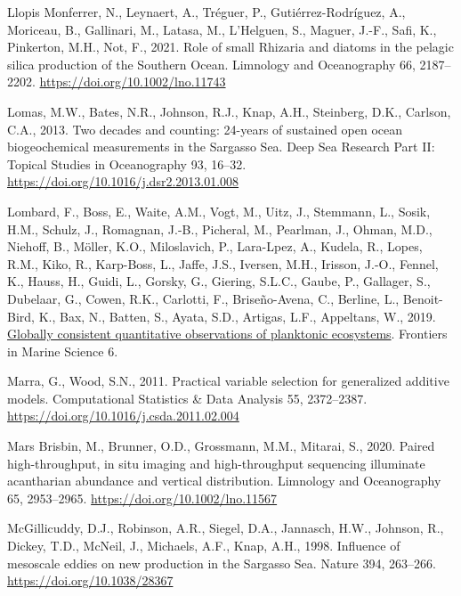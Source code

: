 \documentclass[
]{article}
\newlength{\cslhangindent}
\newlength{\cslentryspacingunit} %
\newenvironment{CSLReferences}[2] %
 {%
  \setlength{\parindent}{0pt}
  \ifodd #1
  \let\oldpar\par
  \def\par{\hangindent=\cslhangindent\oldpar}
  \fi
  \setlength{\parskip}{#2\cslentryspacingunit}
 }%
 {}
\begin{document}
\begin{CSLReferences}{1}{0}
\leavevmode{}%
Llopis Monferrer, N., Leynaert, A., Tréguer, P., Gutiérrez-Rodríguez,
A., Moriceau, B., Gallinari, M., Latasa, M., L'Helguen, S., Maguer,
J.-F., Safi, K., Pinkerton, M.H., Not, F., 2021. Role of small Rhizaria
and diatoms in the pelagic silica production of the Southern Ocean.
Limnology and Oceanography 66, 2187--2202.
\url{https://doi.org/10.1002/lno.11743}

\leavevmode{}%
Lomas, M.W., Bates, N.R., Johnson, R.J., Knap, A.H., Steinberg, D.K.,
Carlson, C.A., 2013. Two decades and counting: 24-years of sustained
open ocean biogeochemical measurements in the Sargasso Sea. Deep Sea
Research Part II: Topical Studies in Oceanography 93, 16--32.
\url{https://doi.org/10.1016/j.dsr2.2013.01.008}

\leavevmode{}%
Lombard, F., Boss, E., Waite, A.M., Vogt, M., Uitz, J., Stemmann, L.,
Sosik, H.M., Schulz, J., Romagnan, J.-B., Picheral, M., Pearlman, J.,
Ohman, M.D., Niehoff, B., Möller, K.O., Miloslavich, P., Lara-Lpez, A.,
Kudela, R., Lopes, R.M., Kiko, R., Karp-Boss, L., Jaffe, J.S., Iversen,
M.H., Irisson, J.-O., Fennel, K., Hauss, H., Guidi, L., Gorsky, G.,
Giering, S.L.C., Gaube, P., Gallager, S., Dubelaar, G., Cowen, R.K.,
Carlotti, F., Briseño-Avena, C., Berline, L., Benoit-Bird, K., Bax, N.,
Batten, S., Ayata, S.D., Artigas, L.F., Appeltans, W., 2019.
\href{https://www.frontiersin.org/articles/10.3389/fmars.2019.00196}{Globally
consistent quantitative observations of planktonic ecosystems}.
Frontiers in Marine Science 6.

\leavevmode{}%
Marra, G., Wood, S.N., 2011. Practical variable selection for
generalized additive models. Computational Statistics \& Data Analysis
55, 2372--2387. \url{https://doi.org/10.1016/j.csda.2011.02.004}

\leavevmode{}%
Mars Brisbin, M., Brunner, O.D., Grossmann, M.M., Mitarai, S., 2020.
Paired high-throughput, in situ imaging and high-throughput sequencing
illuminate acantharian abundance and vertical distribution. Limnology
and Oceanography 65, 2953--2965. \url{https://doi.org/10.1002/lno.11567}

\leavevmode{}%
McGillicuddy, D.J., Robinson, A.R., Siegel, D.A., Jannasch, H.W.,
Johnson, R., Dickey, T.D., McNeil, J., Michaels, A.F., Knap, A.H., 1998.
Influence of mesoscale eddies on new production in the Sargasso Sea.
Nature 394, 263--266. \url{https://doi.org/10.1038/28367}


\end{CSLReferences}
\end{document}
